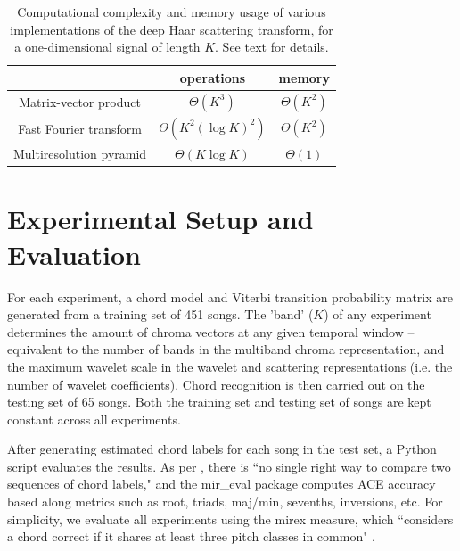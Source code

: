 \documentclass{article}
\makeatletter
\newcommand*{\ie}{i.e.\@\xspace}
\makeatother
\begin{document}
\begin{table}[t]
	\begin{center}
	\begin{tabular}{|c|cc|}
		\hline
		& operations & memory \\
		\hline
		Matrix-vector product & $\Theta(K^3)$ & $\Theta(K^2)$ \\
		Fast Fourier transform & $\Theta(K^2 (\log K)^2)$ & $\Theta(K^2)$ \\
		Multiresolution pyramid & $\Theta(K \log K)$ & $\Theta(1)$ \\
		\hline		
	\end{tabular}
	\end{center}
	\protect\caption{Computational complexity and memory usage of various implementations
	of the deep Haar scattering transform, for a one-dimensional signal
	of length $K$. See text for details.
	\label{table:scattering-complexities}}
\end{table}


\section{Experimental Setup and Evaluation}\label{sec:experiment}
	
	
For each experiment, a chord model and Viterbi transition probability matrix are generated from a 
training set of 451 songs.
The 'band' ($K$) of any experiment determines the amount of chroma vectors at any given temporal
window -- equivalent to the number of bands in the multiband chroma representation, and the
maximum wavelet scale in the wavelet and scattering representations (\ie the number of wavelet
coefficients). Chord recognition is then carried out on the testing set of 65 songs.
Both the training set and testing set of songs are kept constant across all experiments.
	
After generating estimated chord labels for each song in the test set,
a Python script evaluates the results.
As per \cite{raffel2014mir}, there is ``no single right way to compare two sequences of chord labels,"
and the mir\_eval package computes ACE accuracy based along metrics such as root, triads,
maj/min, sevenths, inversions, etc.
For simplicity, we evaluate all experiments using the mirex measure, which ``considers a chord
correct if it shares at least three pitch classes in common" \cite{raffel2014mir}.
\end{document}
